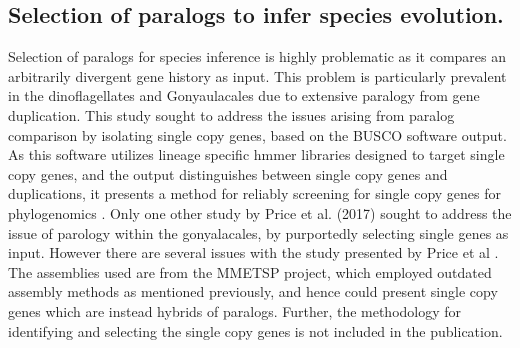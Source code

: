 \documentclass[12pt]{article}
\begin{document}
\subsection*{Selection of paralogs to infer species evolution.}
Selection of paralogs for species inference is highly problematic as it compares an arbitrarily divergent gene history as input. 
This problem is particularly prevalent in the dinoflagellates and Gonyaulacales due to extensive paralogy from gene duplication. 
This study sought to address the issues arising from paralog comparison by isolating single copy genes, based on the BUSCO software output. 
As this software utilizes lineage specific hmmer libraries designed to target single copy genes, and the output distinguishes between single copy genes and duplications, it presents a method for reliably screening for single copy genes for phylogenomics \cite{waterhouse2017busco}.
Only one other study by Price et al. (2017) sought to address the issue of parology within the gonyalacales, by purportedly selecting single genes as input. 
However there are several issues with the study presented by Price et al \cite{price2017robust}. 
The assemblies used are from the MMETSP project, which employed outdated assembly methods as mentioned previously, and hence could present single copy genes which are instead hybrids of paralogs. 
Further, the methodology for identifying and selecting the single copy genes is not included in the publication. 
\end{document}
